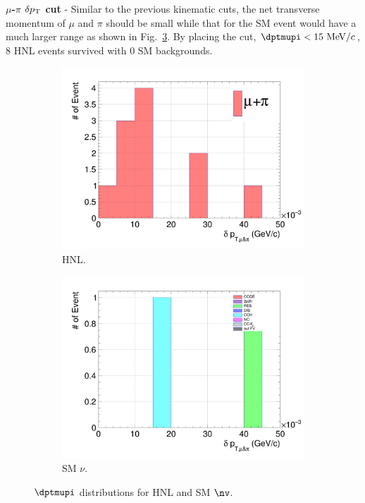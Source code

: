         \textbf{$\mu$-$\pi$ $\delta p_\textrm{T}$ cut} - Similar to the previous kinematic cuts, the net transverse momentum of $\mu$ and $\pi$ should be small while that for the SM event would have a much larger range as shown in Fig.~\ref{fig:mmupi-dpt}. By placing the cut, $\dptmupi<15~\mevc$, $8$ HNL events survived with $0$ SM backgrounds.
        
        \begin{figure}[!htb]
           \centering
           \begin{subfigure}{0.45\textwidth}
                \includegraphics[width=\textwidth]{figures/hnl_sfgmu_mpdpt_stack_al9_300_aftmupikin.png}
                \caption{HNL.}
                \label{fig:hnl-mupidpt}
           \end{subfigure}
           \begin{subfigure}{0.45\textwidth}
                \includegraphics[width=\textwidth]{figures/hnl_sfgmu_mpdpt_stack_al9_SM_aftmupikin.png}
                \caption{SM $\nu$.}
                \label{fig:sm-mupidpt}
           \end{subfigure}
           \caption{$\dptmupi$ distributions for HNL and SM $\nv$.}
           \label{fig:mmupi-dpt}
        \end{figure}

